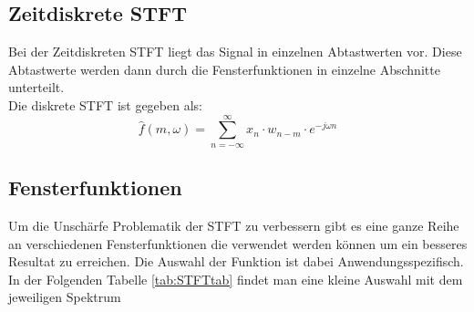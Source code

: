 \subsection{Zeitdiskrete STFT}
Bei der Zeitdiskreten STFT liegt das Signal in einzelnen Abtastwerten vor. Diese Abtastwerte werden dann durch die Fensterfunktionen in einzelne Abschnitte unterteilt. \\
Die diskrete STFT ist gegeben als:
\begin{equation}
	\hat{f}(m, \omega)=\sum_{n=-\infty}^{\infty} x_{n} \cdot w_{n-m}\cdot e^{-j \omega n}
\end{equation}


\subsection{Fensterfunktionen}
Um die Unschärfe Problematik der STFT zu verbessern gibt es eine ganze Reihe an verschiedenen Fensterfunktionen die verwendet werden können um ein besseres Resultat zu erreichen. Die Auswahl der Funktion ist dabei Anwendungsspezifisch. In der Folgenden Tabelle \ref{tab:STFTtab} findet man eine kleine Auswahl mit dem jeweiligen Spektrum 


